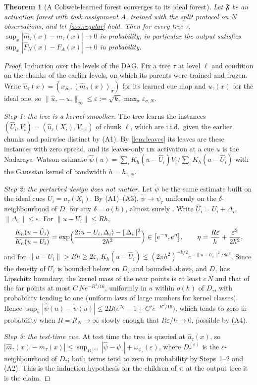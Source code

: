 \documentclass[11pt]{article}
\newtheorem{theorem}{Theorem}
\theoremstyle{definition}
\theoremstyle{remark}
\newcommand{\F}{\mathfrak{F}}
\begin{document}
\begin{theorem}[A Cobweb-learned forest converges to its ideal forest]\label{thm:ideal}
Let $\F$ be an activation forest with task assignment $A$, trained with the split
protocol on $N$ observations, and let \cref{ass:regular} hold.  Then for every tree
$\tau$, $\sup_x|\hat m_\tau(x)-m_\tau(x)|\to0$ in probability; in particular the output
satisfies $\sup_x|\hat F_N(x)-F_A(x)|\to0$ in probability.
\end{theorem}
\begin{proof}
Induction over the levels of the DAG.  Fix a tree $\tau$ at level $\ell$ and condition on
the chunks of the earlier levels, on which its parents were trained and frozen.  Write
$\hat u_\tau(x)=(x_{S_\tau},(\hat m_\sigma(x))_\sigma)$ for its learned cue map and
$u_\tau(x)$ for the ideal one, so $\|\hat u_\tau-u_\tau\|_\infty\le\varepsilon:=
\sqrt{k_\tau}\max_\sigma\varepsilon_{\sigma,N}$.

\emph{Step 1: the tree is a kernel smoother.}  The tree learns the instances
$(\hat U_i,V_i)=(\hat u_\tau(X_i),V_{\tau,i})$ of chunk $\ell$, which are i.i.d.\ given
the earlier chunks and pairwise distinct by (A1).  By \cref{lem:leaves} its leaves are
these instances with zero spread, and its leaves-only \textsc{lik} activation at a cue
$u$ is the Nadaraya--Watson estimate
$\hat\psi(u)=\sum_iK_h(u-\hat U_i)V_i/\sum_iK_h(u-\hat U_i)$ with the Gaussian kernel of
bandwidth $h=h_{\tau,N}$.

\emph{Step 2: the perturbed design does not matter.}  Let $\check\psi$ be the same
estimate built on the ideal cues $U_i=u_\tau(X_i)$.  By (A1)--(A3), $\check\psi\to\psi_\tau$
uniformly on the $\delta$-neighbourhood of $D_\tau$ for any $\delta=o(h)$, almost surely
\citep{devroye1978,mack1982}.  Write $\hat U_i=U_i+\Delta_i$, $\|\Delta_i\|\le\varepsilon$.
For $\|u-U_i\|\le Rh$,
\[
  \frac{K_h(u-\hat U_i)}{K_h(u-U_i)}=\exp\Bigl(\frac{2\langle u-U_i,\Delta_i\rangle-\|\Delta_i\|^2}{2h^2}\Bigr)
  \in\bigl[e^{-\eta},e^{\eta}\bigr],\qquad \eta=\frac{R\varepsilon}{h}+\frac{\varepsilon^2}{2h^2},
\]
and for $\|u-U_i\|>Rh\ge2\varepsilon$, $K_h(u-\hat U_i)\le(2\pi h^2)^{-k/2}
e^{-\|u-U_i\|^2/8h^2}$.  Since the density of $U_\tau$ is bounded below on $D_\tau$ and
bounded above, and $D_\tau$ has Lipschitz boundary, the kernel mass of the near points
is at least $c\,N$ and that of the far points at most $C\,Ne^{-R^2/16}$, uniformly in $u$
within $o(h)$ of $D_\tau$, with probability tending to one (uniform laws of large numbers
for kernel classes).
Hence $\sup_u|\hat\psi(u)-\check\psi(u)|\le2B\bigl(e^{2\eta}-1+C'e^{-R^2/16}\bigr)$, which
tends to zero in probability when $R=R_N\to\infty$ slowly enough that
$R\varepsilon/h\to0$, possible by (A4).

\emph{Step 3: the test-time cue.}  At test time the tree is queried at $\hat u_\tau(x)$,
so $|\hat m_\tau(x)-m_\tau(x)|\le\sup_{D_\tau^{(\varepsilon)}}|\hat\psi-\psi_\tau|+
\omega_{\psi_\tau}(\varepsilon)$, where $D_\tau^{(\varepsilon)}$ is the
$\varepsilon$-neighbourhood of $D_\tau$; both terms tend to zero in probability by
Steps~1--2 and (A2).  This is the induction hypothesis for the children of $\tau$; at
the output tree it is the claim.
\end{proof}
\end{document}
